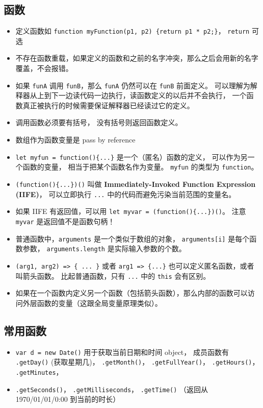 \subsection{函数}
\begin{itemize}
\item 定义函数如 \verb|function myFunction(p1, p2) {return p1 * p2;}|， \verb|return| 可选
\item 不存在函数重载，如果定义的函数和之前的名字冲突，那么之后会用新的名字覆盖，不会报错。
\item 如果 \verb`funA` 调用 \verb`funB`，那么 \verb`funA` 仍然可以在 \verb`funB` 前面定义。 可以理解为解释器从上到下一边读代码一边执行，读函数定义的以后并不会执行， 一个函数真正被执行的时候需要保证解释器已经读过它的定义。
\item 调用函数必须要有括号， 没有括号则返回函数定义。
\item 数组作为函数变量是 pass by reference
\item \verb|let myfun = function(){...}| 是一个（匿名）函数的定义， 可以作为另一个函数的变量， 相当于把某个函数名作为变量。 \verb`myfun` 的类型为 \verb|function|。
\item \verb|(function(){...})()| 叫做 \textbf{Immediately-Invoked Function Expression (IIFE)}， 可以立即执行 \verb|...| 中的代码而避免污染当前范围的变量名。
\item 如果 IIFE 有返回值，可以用 \verb`let myvar = (function(){...})()`。 注意 \verb`myvar` 是返回值不是函数句柄！
\item 普通函数中，\verb`arguments` 是一个类似于数组的对象， \verb`arguments[i]` 是每个函数参数， \verb`arguments.length` 是实际输入参数的个数。
\item \verb`(arg1, arg2) => { ... }` 或者 \verb`arg1 => {...}` 也可以定义匿名函数，或者叫箭头函数。 比起普通函数，只有 \verb`...` 中的 \verb`this` 会有区别。
\item 如果在一个函数内定义另一个函数（包括箭头函数），那么内部的函数可以访问外层函数的变量（这跟全局变量原理类似）。
\end{itemize}

\subsection{常用函数}
\begin{itemize}
\item \verb|var d = new Date()| 用于获取当前日期和时间 object， 成员函数有 \verb|.getDay()| (获取星期几)， \verb|.getMonth()|， \verb|.getFullYear()|， \verb|.getHours()|， \verb|.getMinutes|，
\item \verb|.getSeconds()|， \verb|.getMilliseconds|， \verb|.getTime()| （返回从 1970/01/01/0:00 到当前的时长）
\end{itemize}

